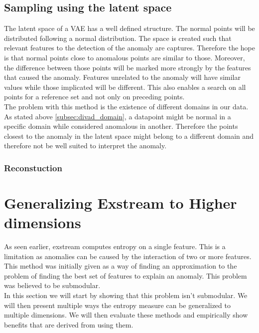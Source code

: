 \documentclass[oneside, a4paper, onecolumn, 11pt]{article}
\begin{document}
\subsection{Sampling using the latent space}
The latent space of a VAE has a well defined structure. The normal points will be distributed following a normal distribution. The space is created such that relevant features to the detection of the anomaly are captures. Therefore the hope is that normal points close to anomalous points are similar to those. Moreover, the difference between those points will be marked more strongly by the features that caused the anomaly. Features unrelated to the anomaly will have similar values while those implicated will be different. This also enables a search on all points for a reference set and not only on preceding points.\\
The problem with this method is the existence of different domains in our data. As stated above \autoref{subsec:divad_domain}, a datapoint might be normal in a specific domain while considered anomalous in another. Therefore the points closest to the anomaly in the latent space might belong to a different domain and therefore not be well suited to interpret the anomaly.\\
\subsubsection{Reconstuction}


\section{Generalizing Exstream to Higher dimensions}
As seen earlier, exstream computes entropy on a single feature. This is a limitation as anomalies can be caused by the interaction of two or more features. This method was initially given as a way of finding an approximation to the problem of finding the best set of features to explain an anomaly. This problem was believed to be submodular.\\
In this section we will start by showing that this problem isn't submodular. We will then present multiple ways the entropy measure can be generalized to multiple dimensions. We will then evaluate these methods and empirically show benefits that are derived from using them.\\
\end{document}

